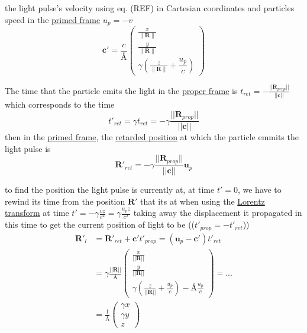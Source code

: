 the light pulse's velocity using eq. (REF) in Cartesian coordinates and particles speed in the \hyperlink{def-Primed-Frame}{primed frame} $u_p=-v$
\begin{equation}%
	\label{light pulse velocity transform}
	\mathbf{c'} =  \dfrac{c}{\text{\AA}}
	\begin{pmatrix}
		\frac{x}{\|\mathbf{R}\|} \\ \frac{y}{\|\mathbf{R}\|} \\ \gamma \left( \frac{z}{\|\mathbf{R}\|} + \dfrac{u_p}{c} \right)
	\end{pmatrix}
\end{equation}%

The time that the particle emits the light in the \hyperlink{def-proper-frame}{proper frame} is $t_{ret}= - \frac{||\mathbf{R}_{prop}||}{||\mathbf{c}||}$ which corresponds to the time
\begin{equation}%
	t'_{ret}= \gamma t_{ret} = - \gamma \frac{||\mathbf{R}_{prop}||}{||\mathbf{c}||}
\end{equation}%
then in the \hyperlink{def-Primed-Frame}{primed frame}, the \hyperlink{def-retarded-position}{retarded position}  at which the particle emmits the light pulse is
\begin{equation}%
	\mathbf{R'}_{ret} = - \gamma \frac{||\mathbf{R}_{prop}||}{||\mathbf{c}||} \mathbf{u}_p
\end{equation}%

to find the position the light pulse is currently at, at time $t'=0$, we have to rewind its time from the position $\mathbf{R}'$ that its at when using the \hyperlink{def-lorentz-transform}{Lorentz transform} at time $t'= -\gamma\frac{vz}{c^2}= \gamma\frac{u_p z}{c^2}$ taking away the displacement it propagated in this time to get the current position of light to be (($t'_{prop} = - t'_{ret}$))
\begin{equation}%
	\begin{split}
		\mathbf{R'}_l & = \mathbf{R'}_{ret} + \mathbf{c'}t'_{prop} = \left( \mathbf{u}_p - \mathbf{c}' \right)t'_{ret} \\
		              & = \gamma \frac{||\mathbf{R}||}{\text{\AA}}
		\begin{pmatrix}
			\frac{x}{||\mathbf{R}||} \\  \frac{y}{||\mathbf{R}||} \\ \gamma \left( \frac{z}{||\mathbf{R}||} +\frac{u_p}{c}\right) - \text{\AA}\frac{u_p}{c}
		\end{pmatrix}
		= ...                                                                                                          \\
		              & = \frac{1}{\text{\AA}}
		\begin{pmatrix}
			\gamma x \\  \gamma y \\ z
		\end{pmatrix}
	\end{split}
\end{equation}%

